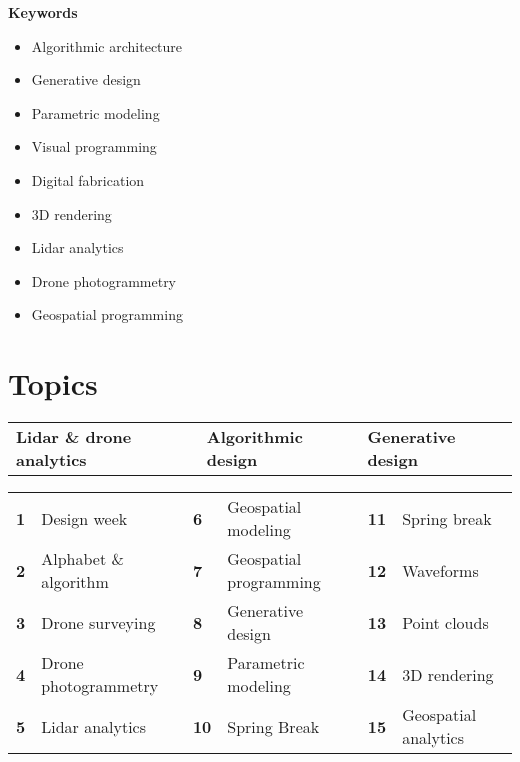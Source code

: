 \documentclass[11pt,article,oneside]{memoir}
\begin{document}
\noindent\textbf{Keywords}
\begin{multicols}{3}
\raggedright
\small
\begin{itemize}
\item Algorithmic architecture
\item Generative design
\item Parametric modeling
\item Visual programming
\item Digital fabrication
\item 3D rendering
\item Lidar analytics
\item Drone photogrammetry
\item Geospatial programming
\end{itemize}
\end{multicols}

\section{Topics}

\begin{table}[H]
\begin{tabular}{l @{\hskip 0.75cm} l @{\hskip 1.9cm} l}
\textbf{Lidar \& drone analytics} & \textbf{Algorithmic design} & \textbf{Generative design}\\
\end{tabular}
\end{table}
%
\vspace*{-1em}
%
\begin{table}[H]
\small
\begin{tabular}{l l l l l l}
\small
\textbf{1} & Design week & \textbf{6} & Geospatial modeling & \textbf{11} & Spring break\\
\textbf{2} & Alphabet \& algorithm & \textbf{7} & Geospatial programming & \textbf{12} & Waveforms\\
\textbf{3} & Drone surveying & \textbf{8} & Generative design & \textbf{13} & Point clouds\\
\textbf{4} & Drone photogrammetry & \textbf{9} & Parametric modeling & \textbf{14} & 3D rendering\\
\textbf{5} & Lidar analytics & \textbf{10} & Spring Break & \textbf{15} & Geospatial analytics\\
\end{tabular}
\end{table}
\end{document}
